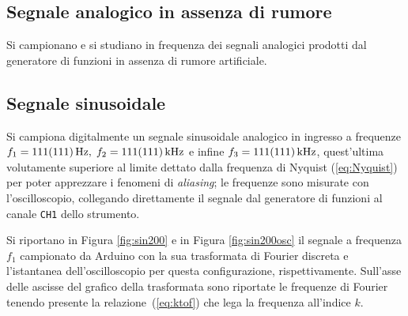 \documentclass[10pt,oneside,a4paper]{article}
\newenvironment{Figure}
  {\par\medskip\noindent\minipage{\linewidth}}
  {\endminipage\par\medskip}
\begin{document}
\begin{multicols}{2}
\section{Segnale analogico in assenza di rumore}
Si campionano e si studiano in frequenza dei segnali analogici prodotti dal generatore di funzioni in assenza di rumore artificiale.
\subsection{Segnale sinusoidale}
Si campiona digitalmente un segnale sinusoidale analogico in ingresso a frequenze $f_1 = \SI{111 \pm 111}{\hertz}, \; f_2 = \SI{111 \pm 111}{\kilo\hertz}$ e infine $f_3 = \SI{111 \pm 111}{\kilo\hertz}$, quest'ultima volutamente superiore al limite dettato dalla frequenza di Nyquist (\ref{eq:Nyquist}) per poter apprezzare i fenomeni di \emph{aliasing}; le frequenze sono misurate con l'oscilloscopio, collegando direttamente il segnale dal generatore di funzioni al canale \texttt{CH1} dello strumento.

Si riportano in Figura \ref{fig:sin200} e in Figura \ref{fig:sin200osc} il segnale a frequenza $f_1$ campionato da Arduino con la sua trasformata di Fourier discreta e l'istantanea dell'oscilloscopio per questa configurazione, rispettivamente. Sull'asse delle ascisse del grafico della trasformata sono riportate le frequenze di Fourier tenendo presente la relazione~(\ref{eq:ktof}) che lega la frequenza all'indice $k$.


%


\end{multicols}
\end{document}
